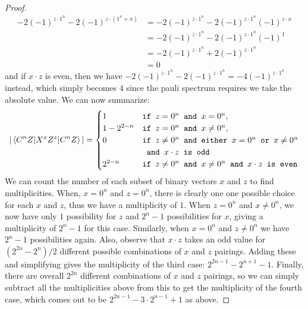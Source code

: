 \documentclass[12pt]{dalthesis}
\begin{document}
\begin{proof}
\begin{equation*}
\begin{split}
-2(-1)^{z \cdot 1^n} - 2(-1)^{z \cdot (1^n + x)} & = -2(-1)^{z \cdot 1^n} - 2(-1)^{z \cdot 1^n} (-1)^{z \cdot x} \\
& = -2(-1)^{z \cdot 1^n} - 2(-1)^{z \cdot 1^n} (-1)^1 \\
& = -2(-1)^{z \cdot 1^n} + 2(-1)^{z \cdot 1^n} \\
& = 0
\end{split}
\end{equation*}
and if $x \cdot z$ is even, then we have $-2(-1)^{z \cdot 1^n} - 2(-1)^{z \cdot 1^n} = -4(-1)^{z \cdot 1^n}$ instead, which simply becomes $4$ since the pauli spectrum requires we take the absolute value. We can now summarize:
\begin{equation*}
|\braket{C^n Z|X^xZ^z|C^n Z}| = \begin{cases}
1 & \texttt{if } z = 0^n \texttt{ and } x = 0^n, \\
1 - 2^{2-n} & \texttt{if } z = 0^n \texttt{ and } x \neq 0^n, \\
0 & \texttt{if } z \neq 0^n \texttt{ and either } x = 0^n \texttt{ or } x \neq 0^n \\
& \texttt{ and }x \cdot z \texttt{ is odd} \\
2^{2-n} & \texttt{if } z \neq 0^n \texttt{ and } x \neq 0^n
 \texttt{ and } x \cdot z \texttt{ is even}
\end{cases}
\end{equation*}
We can count the number of each subset of binary vectors $x$ and $z$ to find multiplicities. When, $x=0^n$ and $z = 0^n$, there is clearly one one possible choice for each $x$ and $z$, thus we have a multiplicity of $1$. When $z = 0^n$ and $x \neq 0^n$, we now have only $1$ possibility for $z$ and $2^n - 1$ possibilities for $x$, giving a multiplicity of $2^n - 1$ for this case. Similarly, when $x = 0^n$ and $z \neq 0^n$ we have $2^n - 1$ possibilities again. Also, observe that $x \cdot z$ takes an odd value for $(2^{2n}-2^{n})/2$ different possible combinations of $x$ and $z$ pairings. Adding these and simplifying gives the multiplicity of the third case: $2^{2n-1} - 2^{n+1} - 1$. Finally, there are overall $2^{2n}$ different combinations of $x$ and $z$ pairings, so we can simply subtract all the multiplicities above from this to get the multiplicity of the fourth case, which comes out to be $2^{2n-1} - 3 \cdot 2^{n-1} + 1$ as above.
\end{proof}
\end{document}
